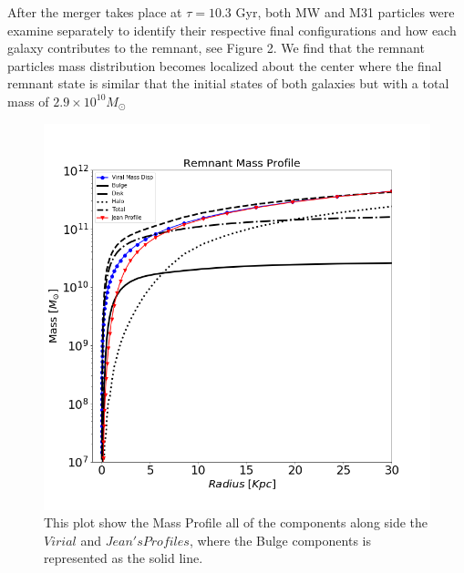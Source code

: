 \documentclass[iop]{emulateapj}
\begin{document}
After the merger takes place at $\tau = 10.3$ Gyr, both MW and M31 particles were examine separately to identify their respective final configurations and how each galaxy contributes to the remnant, see Figure 2. We find that the remnant particles mass distribution becomes localized about the center where the final remnant state is similar that the initial states of both galaxies but with a total mass of $2.9\times 10^{10}M_{\odot}$

\begin{figure}[h]
  \centering
  \includegraphics[width=\columnwidth]{RemnantVirial.png}
  \caption{This plot show the Mass Profile all of the components along side the $Virial$ and $Jean's Profiles$, where the Bulge components is represented as the solid line.}
\end{figure}
\end{document}
